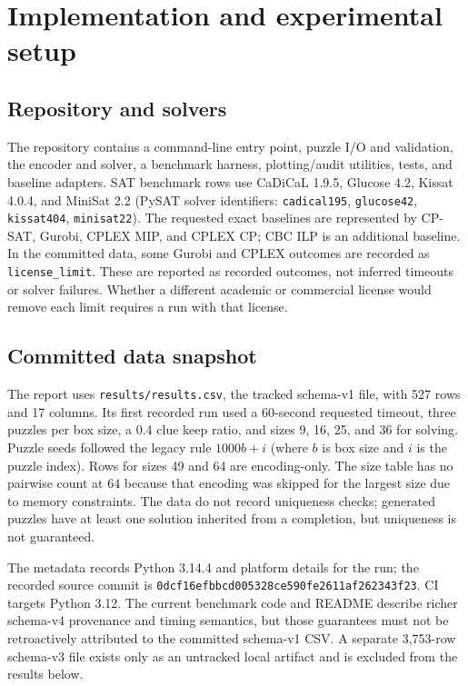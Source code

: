 \IfFileExists{cas-sc.cls}{\documentclass[a4paper,fleqn]{cas-sc}}{\documentclass[a4paper,11pt]{article}}
\begin{document}
\section{Implementation and experimental setup}
\subsection{Repository and solvers}
The repository contains a command-line entry point, puzzle I/O and validation, the encoder and solver, a benchmark harness, plotting/audit utilities, tests, and baseline adapters. SAT benchmark rows use CaDiCaL 1.9.5, Glucose 4.2, Kissat 4.0.4, and MiniSat 2.2 (PySAT solver identifiers: \texttt{cadical195}, \texttt{glucose42}, \texttt{kissat404}, \texttt{minisat22}). The requested exact baselines are represented by CP-SAT, Gurobi, CPLEX MIP, and CPLEX CP; CBC ILP is an additional baseline. In the committed data, some Gurobi and CPLEX outcomes are recorded as \texttt{license\_limit}. These are reported as recorded outcomes, not inferred timeouts or solver failures. Whether a different academic or commercial license would remove each limit requires a run with that license.

\subsection{Committed data snapshot}
The report uses \texttt{results/results.csv}, the tracked schema-v1 file, with 527 rows and 17 columns. Its first recorded run used a 60-second requested timeout, three puzzles per box size, a 0.4 clue keep ratio, and sizes 9, 16, 25, and 36 for solving. Puzzle seeds followed the legacy rule $1000b+i$ (where $b$ is box size and $i$ is the puzzle index). Rows for sizes 49 and 64 are encoding-only. The size table has no pairwise count at 64 because that encoding was skipped for the largest size due to memory constraints. The data do not record uniqueness checks; generated puzzles have at least one solution inherited from a completion, but uniqueness is not guaranteed.

The metadata records Python 3.14.4 and platform details for the run; the recorded source commit is \texttt{0dcf16efbbcd005328ce590fe2611af262343f23}. CI targets Python 3.12. The current benchmark code and README describe richer schema-v4 provenance and timing semantics, but those guarantees must not be retroactively attributed to the committed schema-v1 CSV. A separate 3,753-row schema-v3 file exists only as an untracked local artifact and is excluded from the results below.
\end{document}
